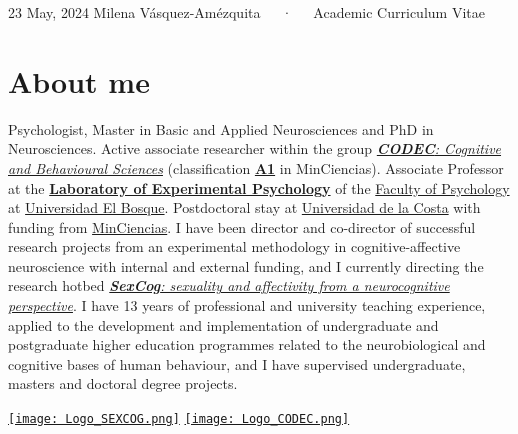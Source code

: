 \documentclass[11pt,a4paper,]{awesome-cv}
\begin{document}
\makecvheader

\makecvfooter
  {23 May, 2024}
    {Milena Vásquez-Amézquita~~~·~~~Academic Curriculum Vitae}
  {\thepage}





\hypertarget{about-me}{%
\section{About me}\label{about-me}}

\begin{minipage}[c]{0.85\linewidth}
Psychologist, Master in Basic and Applied Neurosciences and PhD in Neurosciences. Active associate researcher within the group \href{https://investigaciones.unbosque.edu.co/codec}{\textit{\textbf{CODEC}: Cognitive and Behavioural Sciences}} (classification \href{https://scienti.minciencias.gov.co/gruplac/jsp/visualiza/visualizagr.jsp?nro=00000000001446}{\textbf{A1}} in MinCiencias). Associate Professor at the \href{https://grupo-codec.netlify.app/labpsiexp/}{\textbf{Laboratory of Experimental Psychology}} of the \href{https://www.uelbosque.edu.co/psicologia}{Faculty of Psychology} at \href{https://www.uelbosque.edu.co/}{Universidad El Bosque}. Postdoctoral stay at \href{https://www.cuc.edu.co/}{Universidad de la Costa} with funding from \href{https://minciencias.gov.co/}{MinCiencias}. I have been director and co-director of successful research projects from an experimental methodology in cognitive-affective neuroscience with internal and external funding, and I currently directing the research hotbed \href{https://grupo-codec.netlify.app/sexcog/}{\textit{\textbf{SexCog}: sexuality and affectivity from a neurocognitive perspective}}. I have 13 years of professional and university teaching experience, applied to the development and implementation of undergraduate and postgraduate higher education programmes related to the neurobiological and cognitive bases of human behaviour, and I have supervised undergraduate, masters and doctoral degree projects.
\end{minipage} \begin{minipage}[c]{0.15\linewidth}
\begin{flushright} 
\hfill \href{https://grupo-codec.netlify.app/sexcog/}{\texttt{[image: Logo\_SEXCOG.png]}} \newline \href{https://investigaciones.unbosque.edu.co/codec}{\texttt{[image: Logo\_CODEC.png]}}
\end{flushright}
\end{minipage}
\end{document}
